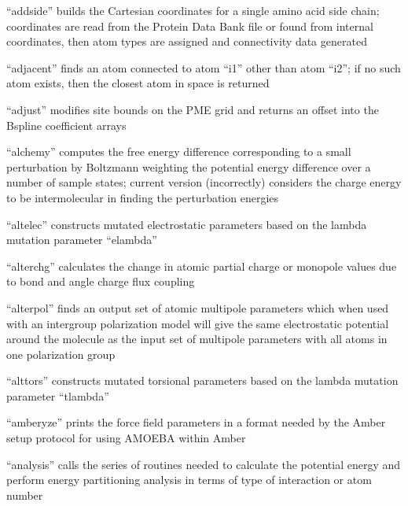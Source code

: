 \documentclass[letterpaper,11pt,english]{sphinxmanual}
\begin{document}
“addside” builds the Cartesian coordinates for a single amino
acid side chain; coordinates are read from the Protein Data
Bank file or found from internal coordinates, then atom types
are assigned and connectivity data generated


“adjacent” finds an atom connected to atom “i1” other than
atom “i2”; if no such atom exists, then the closest atom
in space is returned


“adjust” modifies site bounds on the PME grid and returns
an offset into the B\sphinxhyphen{}spline coefficient arrays


“alchemy” computes the free energy difference corresponding
to a small perturbation by Boltzmann weighting the potential
energy difference over a number of sample states; current
version (incorrectly) considers the charge energy to be
intermolecular in finding the perturbation energies


“altelec” constructs mutated electrostatic parameters based
on the lambda mutation parameter “elambda”


“alterchg” calculates the change in atomic partial charge or
monopole values due to bond and angle charge flux coupling


“alterpol” finds an output set of atomic multipole parameters
which when used with an intergroup polarization model will
give the same electrostatic potential around the molecule as
the input set of multipole parameters with all atoms in one
polarization group


“alttors” constructs mutated torsional parameters based
on the lambda mutation parameter “tlambda”


“amberyze” prints the force field parameters in a format needed
by the Amber setup protocol for using AMOEBA within Amber


“analysis” calls the series of routines needed to calculate
the potential energy and perform energy partitioning analysis
in terms of type of interaction or atom number
\end{document}
